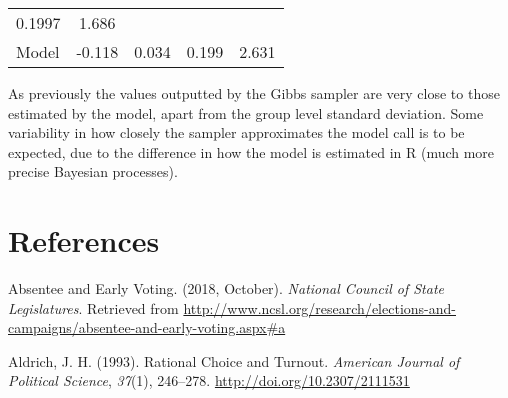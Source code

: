 \documentclass[12pt,twoside]{reedthesis}
\begin{document}
\begin{longtable}[]{@{}lcccc@{}}
\begin{minipage}[t]{0.12\columnwidth}
  0.1997\strut
  \end{minipage} & \begin{minipage}[t]{0.12\columnwidth}\centering\strut
  1.686\strut
  \end{minipage}\tabularnewline
  \begin{minipage}[t]{0.25\columnwidth}\raggedright\strut
  Model\strut
  \end{minipage} & \begin{minipage}[t]{0.16\columnwidth}\centering\strut
  -0.118\strut
  \end{minipage} & \begin{minipage}[t]{0.16\columnwidth}\centering\strut
  0.034\strut
  \end{minipage} & \begin{minipage}[t]{0.12\columnwidth}\centering\strut
  0.199\strut
  \end{minipage} & \begin{minipage}[t]{0.12\columnwidth}\centering\strut
  2.631\strut
  \end{minipage}\tabularnewline
  \bottomrule
  \end{longtable}
  
  As previously the values outputted by the Gibbs sampler are very close
  to those estimated by the model, apart from the group level standard
  deviation. Some variability in how closely the sampler approximates the
  model call is to be expected, due to the difference in how the model is
  estimated in R (much more precise Bayesian processes).
  
  \backmatter
  
  \chapter{References}\label{references}
  
  \noindent
  
  \setlength{\parindent}{-0.20in} \setlength{\leftskip}{0.20in}
  \setlength{\parskip}{8pt}
  
  \hypertarget{refs}{}
  \hypertarget{ref-national_council_of_state_legislatures_absentee_2018}{}
  Absentee and Early Voting. (2018, October). \emph{National Council of
  State Legislatures}. Retrieved from
  \url{http://www.ncsl.org/research/elections-and-campaigns/absentee-and-early-voting.aspx\#a}
  
  \hypertarget{ref-aldrich_rational_1993}{}
  Aldrich, J. H. (1993). Rational Choice and Turnout. \emph{American
  Journal of Political Science}, \emph{37}(1), 246--278.
  \url{http://doi.org/10.2307/2111531}
  
\end{document}
